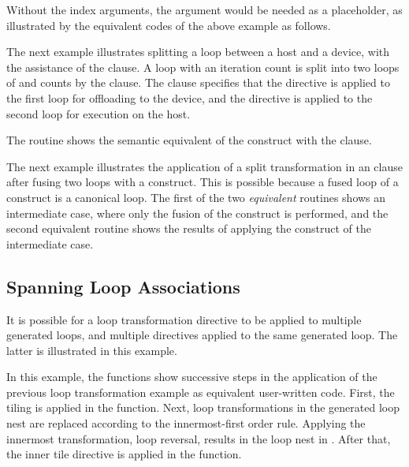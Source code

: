 \pagebreak
{}

Without the index arguments, the  argument would
be needed as a placeholder, as illustrated by the equivalent codes
of the above example as follows.

\pagebreak
{}

The next example illustrates splitting a loop between a host and a device,
with the assistance of the  clause.
A loop with an iteration count  is split into two loops of  and 
 counts by the  clause. The 
 clause specifies that the  
directive is applied to the first loop for offloading to the device, 
and the 
directive is applied to the second loop for execution on the host.

The  routine shows the semantic 
equivalent of the  construct with the  clause.


The next example illustrates the application of a split transformation 
in an 
clause after fusing two loops with a  construct.
This is possible because a fused loop of a  construct is 
a canonical loop.
The first of the two \emph{equivalent} routines shows an intermediate case, where
only the fusion of the  construct is performed, and the second equivalent routine
shows the results of applying the  construct of the intermediate case.



\subsection{Spanning Loop Associations}

It is possible for a loop transformation directive to be applied to multiple generated loops,
and multiple directives applied to the same generated loop.
The latter is illustrated in this example.


In this example, the functions show successive steps in the application of
the previous loop transformation example as equivalent user-written code.
First, the tiling is applied in the  function.
Next, loop transformations in the generated loop nest are replaced according to the innermost-first order rule.
Applying the innermost transformation, loop reversal, results in the loop nest in .
After that, the inner tile directive is applied in the  function.


